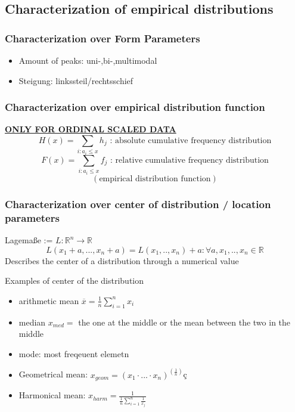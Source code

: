 \documentclass{article}
\begin{document}
\subsection{Characterization of empirical distributions}
\subsubsection{Characterization over Form Parameters}

\begin{itemize}
    \item Amount of peaks: uni-,bi-,multimodal
    \item Steigung: linkssteil/rechtsschief
\end{itemize}

\subsubsection{Characterization over empirical distribution function}
\textbf{\underline{ONLY FOR ORDINAL SCALED DATA}}
\[H(x) = \sum_{i:a_i\leq x}h_j \text{ : absolute cumulative frequency distribution}\]
\[F(x) = \sum_{i:a_i\leq x}f_j \text{ : relative cumulative frequency distribution}\]
\[(\text{empirical distribution function})\]

\subsubsection{Characterization over center of distribution / location parameters}

Lagemaße := $L:\mathbb{R}^n \to \mathbb{R}$
\[L(x_1+a,...,x_n+a) = L(x_1,..,x_n) + a : \forall a,x_1,..,x_n \in \mathbb{R}\]
Describes the center of a distribution through a numerical value

Examples of center of the distribution
 \begin{itemize}
    \item arithmetic mean $\overline{x} = \frac{1}{n}\sum_{i=1}^nx_i$
    \item median $x_{med} = $ the one at the middle or the mean between the two in the middle
    \item mode: most freqeuent elemetn
    \item Geometrical mean: $x_{geom} = (x_1\cdot...\cdot x_n)^(\frac{1}{n})$ç
    \item Harmonical mean: $x_{harm} = \frac{1}{\frac{1}{n}\sum_{i=1}^n\frac{1}{x_j}}$
 \end{itemize}
\end{document}
